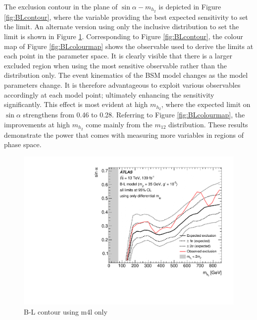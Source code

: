 The exclusion contour in the plane of $\sin\alpha-m_{h_2}$ is depicted in Figure \ref{fig:BLcontour}, where the variable providing the best expected sensitivity to set the limit. An alternate version using only the inclusive \mFourL distribution to set the limit is shown in Figure \ref{fig:BLcontourm4l}. Corresponding to Figure \ref{fig:BLcontour}, the colour map of Figure \ref{fig:BLcolourmap} shows the observable used to derive the limits at each point in the parameter space. It is clearly visible that there is a larger excluded region when using the most sensitive observable rather than the \mFourL distribution only. The event kinematics of the BSM model changes as the model parameters change. It is therefore advantageous to exploit various observables accordingly at each model point; ultimately enhancing the sensitivity significantly. This effect is most evident at high $m_{h_2}$, where the expected limit on $\sin\alpha$ strengthens from 0.46 to 0.28. Referring to Figure \ref{fig:BLcolourmap}, the improvements at high $m_{h_2}$ come mainly from the $m_{12}$ distribution. These results demonstrate the power that comes with measuring more variables in regions of phase space. 
\begin{figure}
    \centering
    \includegraphics[width=\mediumfigwidth]{Figures/m4l/Interpretations/UpperLimitBandWithContour_2D_withTheoExcl_m4l.pdf}
    \caption{B-L contour using m4l only}
    \label{fig:BLcontourm4l}
\end{figure}
